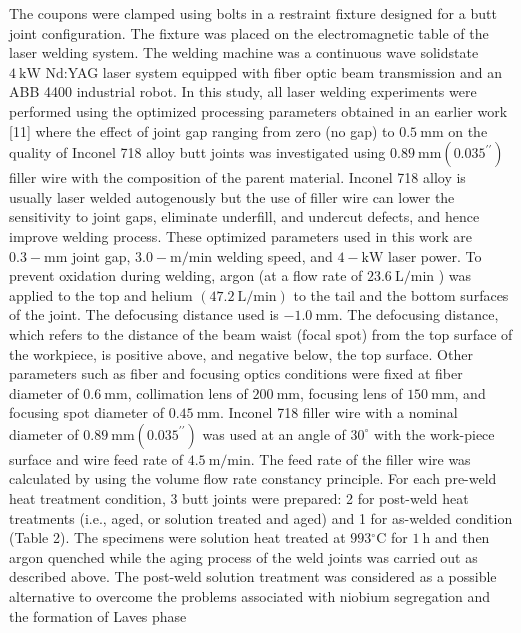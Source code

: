 \documentclass[10pt]{article}
\begin{document}
The coupons were clamped using bolts in a restraint fixture designed for a butt joint configuration. The fixture was placed on the electromagnetic table of the laser welding system. The welding machine was a continuous wave solidstate $4 \mathrm{~kW}$ Nd:YAG laser system equipped with fiber optic beam transmission and an ABB 4400 industrial robot. In this study, all laser welding experiments were performed using the optimized processing parameters obtained in an earlier work [11] where the effect of joint gap ranging from zero (no gap) to $0.5 \mathrm{~mm}$ on the quality of Inconel 718 alloy butt joints was investigated using $0.89 \mathrm{~mm}\left(0.035^{\prime \prime}\right)$ filler wire with the composition of the parent material. Inconel 718 alloy is usually laser welded autogenously but the use of filler wire can lower the sensitivity to joint gaps, eliminate underfill, and undercut defects, and hence improve welding process. These optimized parameters used in this work are $0.3-\mathrm{mm}$ joint gap, $3.0-\mathrm{m} / \mathrm{min}$ welding speed, and $4-\mathrm{kW}$ laser power. To prevent oxidation during welding, argon (at a flow rate of $23.6 \mathrm{~L} / \mathrm{min}$ ) was applied to the top and helium $(47.2 \mathrm{~L} / \mathrm{min})$ to the tail and the bottom surfaces of the joint. The defocusing distance used is $-1.0 \mathrm{~mm}$. The defocusing distance, which refers to the distance of the beam waist (focal spot) from the top surface of the workpiece, is positive above, and negative below, the top surface. Other parameters such as fiber and focusing optics conditions were fixed at fiber diameter of $0.6 \mathrm{~mm}$, collimation lens of $200 \mathrm{~mm}$, focusing lens of $150 \mathrm{~mm}$, and focusing spot diameter of $0.45 \mathrm{~mm}$. Inconel 718 filler wire with a nominal diameter of $0.89 \mathrm{~mm}\left(0.035^{\prime \prime}\right)$ was used at an angle of $30^{\circ}$ with the work-piece surface and wire feed rate of $4.5 \mathrm{~m} / \mathrm{min}$. The feed rate of the filler wire was calculated by using the volume flow rate constancy principle. For each pre-weld heat treatment condition, 3 butt joints were prepared: 2 for post-weld heat treatments (i.e., aged, or solution treated and aged) and 1 for as-welded condition (Table 2). The specimens were solution heat treated at $993{ }^{\circ} \mathrm{C}$ for $1 \mathrm{~h}$ and then argon quenched while the aging process of the weld joints was carried out as described above. The post-weld solution treatment was considered as a possible alternative to overcome the problems associated with niobium segregation and the formation of Laves phase
\end{document}
